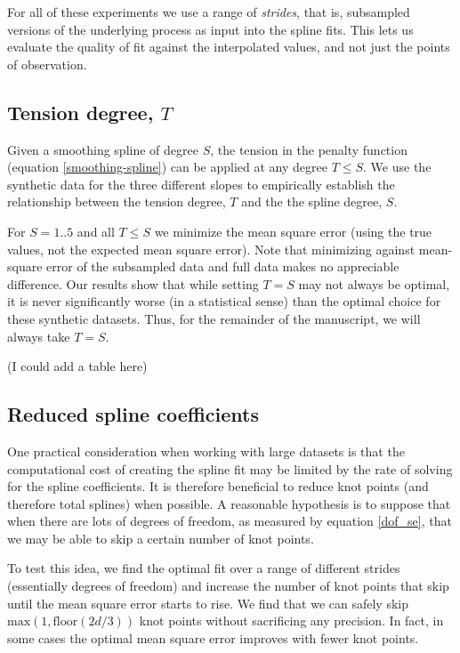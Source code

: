 \documentclass[10pt,journal]{IEEEtran}
\begin{document}
For all of these experiments we use a range of \emph{strides}, that is, subsampled versions of the underlying process as input into the spline fits. This lets us evaluate the quality of fit against the interpolated values, and not just the points of observation.

\subsection{Tension degree, $T$} \label{tension_degree}

Given a smoothing spline of degree $S$, the tension in the penalty function (equation \ref{smoothing-spline}) can be applied at any degree $T\leq S$. We use the synthetic data for the three different slopes to empirically establish the relationship between the tension degree, $T$ and the the spline degree, $S$. 

For $S=1..5$ and all $T\leq S$ we minimize the mean square error (using the true values, not the expected mean square error). Note that minimizing against mean-square error of the subsampled data and full data makes no appreciable difference. Our results show that while setting $T=S$ may not always be optimal, it is never significantly worse (in a statistical sense) than the optimal choice for these synthetic datasets. Thus, for the remainder of the manuscript, we will always take $T=S$.

(I could add a table here)

\subsection{Reduced spline coefficients} \label{reduced_coefficients}

One practical consideration when working with large datasets is that the computational cost of creating the spline fit may be limited by the rate of solving for the spline coefficients. It is therefore beneficial to reduce knot points (and therefore total splines) when possible. A reasonable hypothesis is to suppose that when there are lots of degrees of freedom, as measured by equation \ref{dof_se}, that we may be able to skip a certain number of knot points.

To test this idea, we find the optimal fit over a range of different strides (essentially degrees of freedom) and increase the number of knot points that skip until the mean square error starts to rise. We find that we can safely skip $\textrm{max}(1,\textrm{floor}(2d/3))$ knot points without sacrificing any precision. In fact, in some cases the optimal mean square error improves with fewer knot points.
\end{document}
